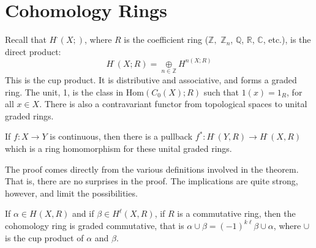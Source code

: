 \documentclass{book}                                                           %
\begin{document}
        \section{Cohomology Rings}
            Recall that $H^{\cdot}(X;)$, where $R$ is the coefficient
            ring ($\mathbb{Z},$ $\mathbb{Z}_{n}$, $\mathbb{Q}$,
            $\mathbb{R}$, $\mathbb{C}$, etc.), is the direct product:
            \begin{equation}
                H^{\cdot}(X;R)=\underset{n\in\mathbb{Z}}{\oplus}
                    H^{n(X;R)}
            \end{equation}
            This is the cup product. It is distributive and associative,
            and forms a graded ring. The unit, 1, is the class
            in $\mathrm{Hom}(C_{0}(X);R)$ such that $1(x)=1_{R}$, for
            all $x\in{X}$. There is also a contravariant functor
            from topological spaces to unital graded rings.
            \begin{theorem}
                If $f:X\rightarrow{Y}$ is continuous, then there is a
                pullback
                $f^{*}:H^{\cdot}(Y,R)\rightarrow{H}^{\cdot}(X,R)$
                which is a ring homomorphism for these unital graded
                rings.
            \end{theorem}
            The proof comes directly from the various definitions
            involved in the theorem. That is, there are no surprises in
            the proof. The implications are quite strong, however, and
            limit the possibilities.
            \begin{theorem}
                If $\alpha\in{H}^{}(X,R)$ and if
                $\beta\in{H}^{\ell}(X,R)$, if $R$ is a commutative ring,
                then the cohomology ring is graded commutative, that is
                $\alpha\cup\beta=(\minus{1})^{k\ell}\beta\cup\alpha$,
                where $\cup$ is the cup product of $\alpha$ and $\beta$.
            \end{theorem}
\end{document}
